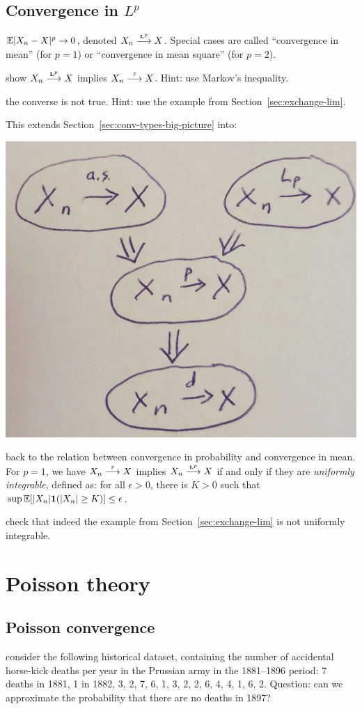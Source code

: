 \documentclass{article}
\begin{document}
\subsection{Convergence in $L^p$}

 ${\mathbb E} |X_n - X|^p \to 0$, denoted $X_n \stackrel{\scriptscriptstyle\mathbf L^p}{\longrightarrow} X$. Special cases are called ``convergence in mean'' (for $p=1$) or ``convergence in mean square'' (for $p=2$).

 show $X_n \stackrel{\scriptscriptstyle\mathbf L^p}{\longrightarrow} X$ implies $X_n \stackrel{\scriptscriptstyle {\mathbb P}}{\longrightarrow} X$. Hint: use Markov's inequality.

 the converse is not true. Hint: use the example from Section~\ref{sec:exchange-lim}. 

 This extends Section~\ref{sec:conv-types-big-picture} into:
\begin{center}
	\includegraphics[width=0.5\linewidth]{figures/types-of-conv} 
\end{center}

 back to the relation between convergence in probability and convergence in mean. For $p=1$, we have $X_n \stackrel{\scriptscriptstyle {\mathbb P}}{\longrightarrow} X$ implies $X_n \stackrel{\scriptscriptstyle\mathbf L^p}{\longrightarrow} X$ if and only if they are \emph{uniformly integrable}, defined as: for all $\epsilon > 0$, there is $K > 0$ such that $\sup {\mathbb E}[|X_n| {\mathbf 1}(|X_n| \ge K)] \le \epsilon$. 

 check that indeed the example from Section~\ref{sec:exchange-lim} is not uniformly integrable.


\section{Poisson theory}

\subsection{Poisson convergence}\label{sec:poisson-convergence}

 consider the following historical dataset, containing the number of accidental horse-kick deaths per year in the Prussian army in the 1881--1896 period: 7 deaths in 1881, 1 in 1882, 3, 2, 7, 6, 1, 3, 2, 2, 6, 4, 4, 1, 6, 2. Question: can we approximate the probability that there are no deaths in 1897?
\end{document}
